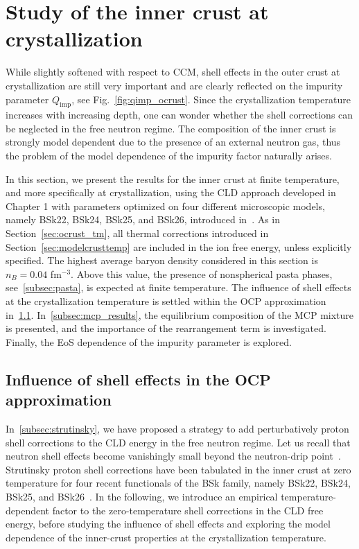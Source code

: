 \section{Study of the inner crust at crystallization}\label{sec:icrust_tm}

While slightly softened with respect to CCM, shell effects in the outer 
crust at crystallization are still very important and are clearly reflected on 
the impurity parameter $Q_{\text{imp}}$, see Fig.~\ref{fig:qimp_ocrust}. 
Since the crystallization temperature increases with increasing depth, one can
wonder whether the shell corrections can be neglected in the free neutron
regime.
%
The composition of the inner crust is strongly model dependent due to the 
presence of an external neutron gas, thus the problem of the model dependence 
of the impurity factor naturally arises.

In this section, we present the results for the inner crust at finite
temperature, and more specifically at crystallization, using the CLD approach
developed in Chapter 1 with parameters optimized on four different microscopic
models, namely BSk22, BSk24, BSk25, and BSk26, introduced 
in~\cite{Goriely2013}.
As in Section~\ref{sec:ocrust_tm}, all thermal corrections introduced in
Section~\ref{sec:modelcrusttemp} are included in the ion free energy, unless
explicitly specified.
The highest average baryon density considered in this section is $n_B = 0.04$
fm$^{-3}$. Above this value, the presence of nonspherical pasta phases,
see~\ref{subsec:pasta}, is expected at finite temperature.
The influence of shell effects at the crystallization temperature is 
settled within the OCP approximation in~\ref{subsec:shtemp}.
In~\ref{subsec:mcp_results}, the equilibrium 
composition of the MCP mixture is presented, and the importance of the 
rearrangement term is investigated. Finally, the EoS dependence of the 
impurity parameter is explored.

\subsection{Influence of shell effects in the OCP
approximation}\label{subsec:shtemp}

In~\ref{subsec:strutinsky}, we have proposed a strategy to add perturbatively 
proton shell corrections to the CLD energy in the free neutron
regime. Let us recall that neutron shell effects become vanishingly small 
beyond the neutron-drip point~\cite{Chamel2006,Chamel2007}.
Strutinsky proton shell corrections have been tabulated in the inner 
crust at zero temperature for four recent functionals of the BSk family, namely 
BSk22, BSk24, BSk25, and BSk26~\cite{Pearson2018}. In the following, we 
introduce an empirical temperature-dependent factor to the zero-temperature 
shell corrections in the CLD free energy, before studying the influence of 
shell effects and exploring the model dependence of the inner-crust properties 
at the crystallization temperature.

